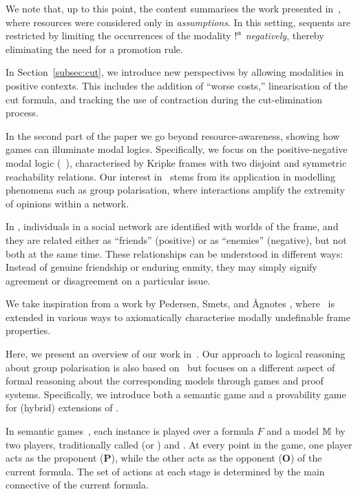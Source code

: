 We note that, up to this point, the content summarises the work presented in~\cite{DBLP:conf/tableaux/LangOPF19}, where resources were considered only in {\em assumptions}. In this setting, sequents are restricted by limiting the occurrences of the modality $\hbox{$\mathop{!}^{a}$}$ {\em negatively}, thereby eliminating the need for a promotion rule.

In Section~\ref{subsec:cut}, we introduce new perspectives by allowing modalities in positive contexts. This includes the addition of ``worse costs,'' linearisation of the cut formula, and tracking the use of contraction during the cut-elimination process.

In the second part of the paper we go beyond resource-awareness, showing how games can illuminate modal logics. Specifically, we focus on the positive-negative modal logic (\PNL~\cite{DBLP:journals/jolli/XiongA20}), characterised by Kripke frames with two disjoint and symmetric reachability relations. Our interest in \PNL\ stems from its application in modelling phenomena such as group polarisation, where interactions amplify the extremity of opinions within a network. 

In \PNL, individuals in a
social network are identified with worlds of the frame, and they are related
either as ``friends'' (positive) or as ``enemies'' (negative), but not both at
the same time. These relationships can be understood in different ways: Instead
of genuine friendship or enduring enmity, they may simply signify agreement or
disagreement on a particular issue. 

We take inspiration from a work by Pedersen, Smets, and {\AA}gnotes
\cite{DBLP:journals/logcom/PedersenSA21}, where \PNL~is extended in
various ways to axiomatically characterise modally undefinable frame
properties.
 
Here, we present an overview of our work in~\cite{LPAR2024:Reasoning_About_Group_Polarization}. Our approach to logical reasoning about group polarisation is also based on \PNL~but focuses on a different aspect of formal reasoning about the corresponding models through games and proof systems. Specifically, we introduce both a semantic game and a provability game for (hybrid) extensions of \PNL.

In semantic games~\cite{Hintikka1973-HINLLA-2}, each instance is played over a formula $F$ and a model $\mathbb{M}$ by two players, traditionally called \Ic (or \Me) and \You. At every point in the game, one player acts as the proponent ($\mathbf P$), while the other acts as the opponent ($\mathbf O$) of the current formula. The set of actions at each stage is determined by the main connective of the current formula.

